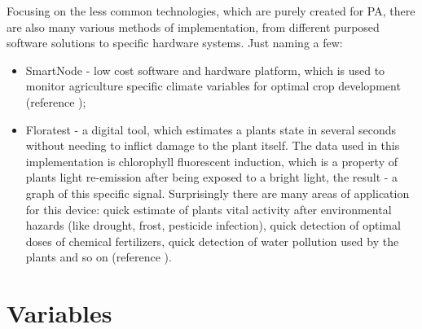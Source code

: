 \documentclass[11pt,a4paper,footinclude=true,headinclude=true, oneside]{scrbook}
\begin{document}
Focusing on the less common technologies, which are purely created for PA, there are also many various methods of implementation, from different purposed software solutions to specific hardware systems. Just naming a few:

\begin{itemize}
    \item SmartNode - low cost software and hardware platform, which is used to monitor agriculture specific climate variables for optimal crop development (reference \cite{nunez_v_design_2017});
    \item Floratest - a digital tool, which estimates a plants state in several seconds without needing to inflict damage to the plant itself. The data used in this implementation is chlorophyll fluorescent induction, which is a property of plants light re-emission after being exposed to a bright light, the result - a graph of this specific signal. Surprisingly there are many areas of application for this device: quick estimate of plants vital activity after environmental hazards (like drought, frost, pesticide infection), quick detection of optimal doses of chemical fertilizers, quick detection of water pollution used by the plants and so on (reference \cite{palagin_data_2011}).
\end{itemize}

    
\section{Variables}
\end{document}
